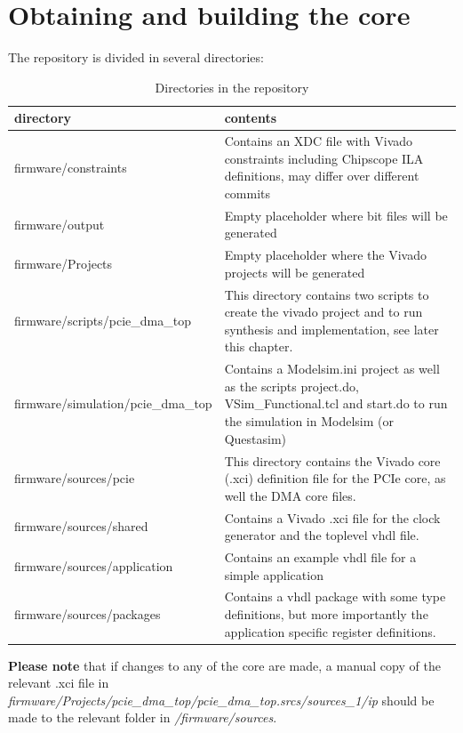 \section{Obtaining and building the core}
The repository is divided in several directories:
\begin{table}[H]
	\centering
	\begin{tabularx}{\textwidth}{|l|X|}
	\hline
	\textbf{directory}&\textbf{contents}\\
	\hline
	firmware/constraints&Contains an XDC file with Vivado constraints including Chipscope ILA definitions, may differ over different commits\\
	\hline
	firmware/output&Empty placeholder where bit files will be generated\\
	\hline
	firmware/Projects&Empty placeholder where the Vivado projects will be generated\\
	\hline
	firmware/scripts/pcie\_dma\_top&This directory contains two scripts to create the vivado project and to run synthesis and implementation, see later this chapter.\\
	\hline
	firmware/simulation/pcie\_dma\_top&Contains a Modelsim.ini project as well as the scripts project.do, VSim\_Functional.tcl and start.do to run the simulation in Modelsim (or Questasim)\\
	\hline
	firmware/sources/pcie&This directory contains the Vivado core (.xci) definition file for the PCIe core, as well the DMA core files.\\
	\hline
	firmware/sources/shared&Contains a Vivado .xci file for the clock generator and the toplevel vhdl file.\\
	\hline
	firmware/sources/application&Contains an example vhdl file for a simple application\\
	\hline
	firmware/sources/packages&Contains a vhdl package with some type definitions, but more importantly the application specific register definitions.\\
	\hline		
	
	\end{tabularx}
	\caption{Directories in the repository}\label{tab:directories}
\end{table}

\textbf{Please note} that if changes to any of the core are made, a manual copy of the relevant .xci file in \textit{firmware/Projects/pcie\_dma\_top/pcie\_dma\_top.srcs/sources\_1/ip} should be made to the relevant folder in \textit{/firmware/sources}.

